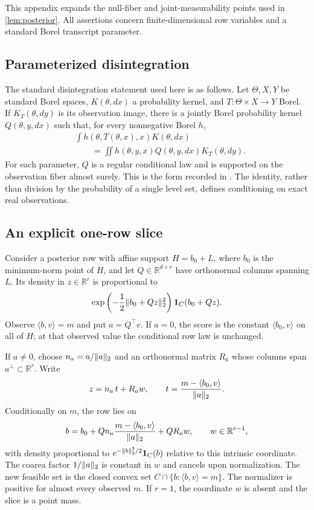 \documentclass[11pt]{article}
\numberwithin{equation}{section}
\theoremstyle{definition}
\theoremstyle{remark}
\newcommand{\R}{\mathbb R}
\newcommand{\one}{\mathbf 1}
\DeclarePairedDelimiter{\norm}{\lVert}{\rVert}
\newcommand{\ip}[2]{\langle #1,#2\rangle}
\begin{document}
This appendix expands the null-fiber and joint-measurability points used in \cref{lem:posterior}. All assertions concern finite-dimensional row variables and a standard Borel transcript parameter.

\subsection{Parameterized disintegration}

The standard disintegration statement used here is as follows. Let $\Theta,X,Y$ be standard Borel spaces, $K(\theta,dx)$ a probability kernel, and $T:\Theta\times X\to Y$ Borel. If $K_T(\theta,dy)$ is its observation image, there is a jointly Borel probability kernel $Q(\theta,y,dx)$ such that, for every nonnegative Borel $h$,
\begin{equation}\label{eq:disintegration}
\begin{split}
&\int h(\theta,T(\theta,x),x)K(\theta,dx)\\
&\qquad=\iint h(\theta,y,x)Q(\theta,y,dx)K_T(\theta,dy).
\end{split}
\end{equation}
For each parameter, $Q$ is a regular conditional law and is supported on the observation fiber almost surely. This is the form recorded in \cite[Lemma~10]{ZZQL2026}. The identity, rather than division by the probability of a single level set, defines conditioning on exact real observations.

\subsection{An explicit one-row slice}

Consider a posterior row with affine support $H=b_0+L$, where $b_0$ is the minimum-norm point of $H$, and let $Q\in\R^{d\times r}$ have orthonormal columns spanning $L$. Its density in $z\in\R^r$ is proportional to
\[
\exp\left(-\frac12\norm{b_0+Qz}_2^2\right)\one_C(b_0+Qz).
\]
Observe $\ip{b}{v}=m$ and put $a=Q^\top v$. If $a=0$, the score is the constant $\ip{b_0}{v}$ on all of $H$; at that observed value the conditional row law is unchanged.

If $a\ne0$, choose $n_a=a/\norm a_2$ and an orthonormal matrix $R_a$ whose columns span $a^\perp\subset\R^r$. Write
\[
z=n_a\,t+R_a w,
\qquad
t=\frac{m-\ip{b_0}{v}}{\norm a_2}.
\]
Conditionally on $m$, the row lies on
\begin{equation}\label{eq:explicit-fiber}
b=b_0+Qn_a\frac{m-\ip{b_0}{v}}{\norm a_2}+QR_a w,
\qquad w\in\R^{r-1},
\end{equation}
with density proportional to $e^{-\norm b_2^2/2}\one_C(b)$ relative to this intrinsic coordinate. The coarea factor $1/\norm a_2$ is constant in $w$ and cancels upon normalization. The new feasible set is the closed convex set $C\cap\{b:\ip{b}{v}=m\}$. The normalizer is positive for almost every observed $m$. If $r=1$, the coordinate $w$ is absent and the slice is a point mass.
\end{document}
